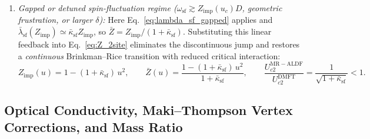 \documentclass[11pt,a4paper]{article}
\numberwithin{equation}{section}
\theoremstyle{plain}
\theoremstyle{definition}
\begin{document}
\begin{enumerate}
    \item \emph{Gapped or detuned spin-fluctuation regime ($\omega_{\mathrm{sf}} \gtrsim Z_{\mathrm{imp}}(u_c)D$, geometric frustration, or larger $\delta$):}
    Here Eq.~\eqref{eq:lambda_sf_gapped} applies and
    $\bar{\lambda}_{\mathrm{sf}}(Z_{\mathrm{imp}}) \simeq \bar{\kappa}_{\mathrm{sf}}Z_{\mathrm{imp}}$,
    so $\bar{Z} = Z_{\mathrm{imp}}/(1 + \bar{\kappa}_{\mathrm{sf}})$. Substituting this
    linear feedback into Eq.~\eqref{eq:Z_2site} eliminates the discontinuous jump and
    restores a \emph{continuous} Brinkman--Rice transition with reduced critical
    interaction:
    \begin{equation}
        Z_{\mathrm{imp}}(u) = 1 - (1 + \bar{\kappa}_{\mathrm{sf}})\, u^2,
        \qquad
        \bar{Z}(u) = \frac{1 - (1 + \bar{\kappa}_{\mathrm{sf}})\, u^2}{1 + \bar{\kappa}_{\mathrm{sf}}},
        \qquad
        \frac{U_{c2}^{\mathrm{MR-ALDF}}}{U_{c2}^{\mathrm{DMFT}}}
        = \frac{1}{\sqrt{1 + \bar{\kappa}_{\mathrm{sf}}}} < 1.
        \label{eq:Uc_gapped}
    \end{equation}
\end{enumerate}

\subsection{Optical Conductivity, Maki--Thompson Vertex Corrections, and Mass Ratio}
\label{sec:optics}
\end{document}
